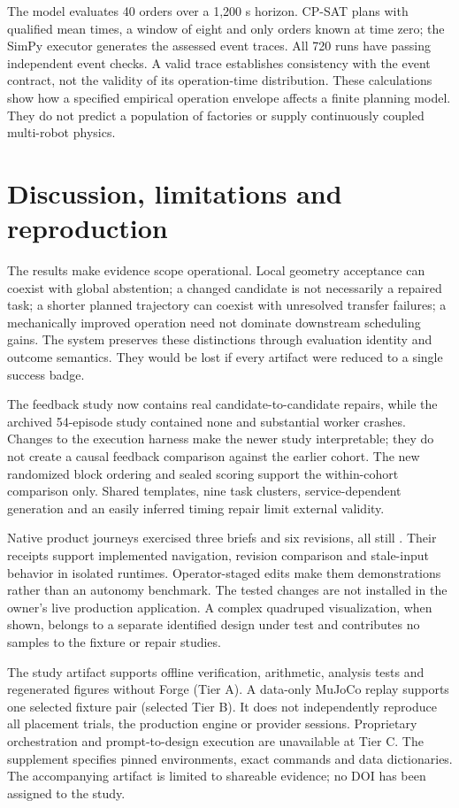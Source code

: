 The model evaluates 40 orders over a 1,200 s horizon. CP-SAT plans with qualified mean times, a window of eight and only orders known at time zero; the SimPy executor generates the assessed event traces. All 720 runs have passing independent event checks. A valid trace establishes consistency with the event contract, not the validity of its operation-time distribution. These calculations show how a specified empirical operation envelope affects a finite planning model. They do not predict a population of factories or supply continuously coupled multi-robot physics.

\section{Discussion, limitations and reproduction}
The results make evidence scope operational. Local geometry acceptance can coexist with global abstention; a changed candidate is not necessarily a repaired task; a shorter planned trajectory can coexist with unresolved transfer failures; a mechanically improved operation need not dominate downstream scheduling gains. The system preserves these distinctions through evaluation identity and outcome semantics. They would be lost if every artifact were reduced to a single success badge.

The feedback study now contains real candidate-to-candidate repairs, while the archived 54-episode study contained none and substantial worker crashes. Changes to the execution harness make the newer study interpretable; they do not create a causal feedback comparison against the earlier cohort. The new randomized block ordering and sealed scoring support the within-cohort comparison only. Shared templates, nine task clusters, service-dependent generation and an easily inferred timing repair limit external validity.

Native product journeys exercised three briefs and six revisions, all still . Their receipts support implemented navigation, revision comparison and stale-input behavior in isolated runtimes. Operator-staged edits make them demonstrations rather than an autonomy benchmark. The tested changes are not installed in the owner's live production application. A complex quadruped visualization, when shown, belongs to a separate identified design under test and contributes no samples to the fixture or repair studies.

The study artifact supports offline verification, arithmetic, analysis tests and regenerated figures without Forge (Tier A). A data-only MuJoCo replay supports one selected fixture pair (selected Tier B). It does not independently reproduce all placement trials, the production engine or provider sessions. Proprietary orchestration and prompt-to-design execution are unavailable at Tier C. The supplement specifies pinned environments, exact commands and data dictionaries. The accompanying artifact is limited to shareable evidence; no DOI has been assigned to the study.

